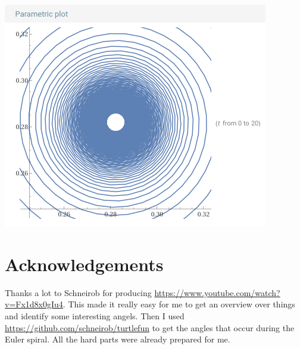 \documentclass[pdftex,a4paper]{scrartcl}
\begin{document}
\includegraphics[width=\textwidth]{continuous20.png}

\section{Acknowledgements}
Thanks a lot to Schneirob for producing \url{https://www.youtube.com/watch?v=Fx1d8x0gIu4}. This made it really easy for
me to get an overview over things and identify some interesting angels. Then I used
\url{https://github.com/schneirob/turtlefun} to get the angles that occur during the Euler spiral. All the hard parts
were already prepared for me.
\end{document}
